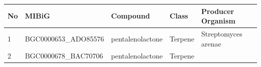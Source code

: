 \documentclass[12pt,twoside]{reedthesis}
\begin{document}
  \begin{longtable}[]{@{}lllll@{}}
  \toprule
  \begin{minipage}[b]{0.05\columnwidth}\raggedright\strut
  No\strut
  \end{minipage} & \begin{minipage}[b]{0.24\columnwidth}\raggedright\strut
  MIBiG\strut
  \end{minipage} & \begin{minipage}[b]{0.20\columnwidth}\raggedright\strut
  Compound\strut
  \end{minipage} & \begin{minipage}[b]{0.08\columnwidth}\raggedright\strut
  Class\strut
  \end{minipage} & \begin{minipage}[b]{0.25\columnwidth}\raggedright\strut
  Producer Organism\strut
  \end{minipage}\tabularnewline
  \midrule
  \endhead
  \begin{minipage}[t]{0.05\columnwidth}\raggedright\strut
  1\strut
  \end{minipage} & \begin{minipage}[t]{0.24\columnwidth}\raggedright\strut
  BGC0000653\_ADO85576\strut
  \end{minipage} & \begin{minipage}[t]{0.20\columnwidth}\raggedright\strut
  pentalenolactone\strut
  \end{minipage} & \begin{minipage}[t]{0.08\columnwidth}\raggedright\strut
  Terpene\strut
  \end{minipage} & \begin{minipage}[t]{0.25\columnwidth}\raggedright\strut
  Streptomyces arenae\strut
  \end{minipage}\tabularnewline
  \begin{minipage}[t]{0.05\columnwidth}\raggedright\strut
  2\strut
  \end{minipage} & \begin{minipage}[t]{0.24\columnwidth}\raggedright\strut
  BGC0000678\_BAC70706\strut
  \end{minipage} & \begin{minipage}[t]{0.20\columnwidth}\raggedright\strut
  pentalenolactone\strut
  \end{minipage} & \begin{minipage}[t]{0.08\columnwidth}\raggedright\strut
  Terpene\strut
  \end{minipage} & \begin{minipage}[t]{0.25\columnwidth}\raggedright\strut

\end{minipage}
\end{longtable}
\end{document}
